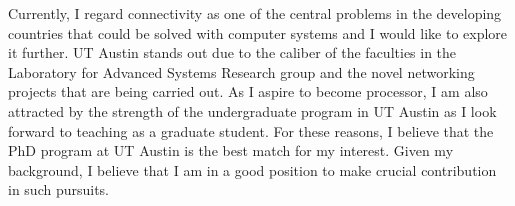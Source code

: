 \documentclass[12pt]{article}
\begin{document}
%
%

Currently, I regard connectivity as one of the central problems in the developing countries that could be solved with computer systems and I would like to explore it further. UT Austin stands out due to the caliber of the faculties in the Laboratory for Advanced Systems Research group and the novel networking projects that are being carried out. As I aspire to become processor, I am also attracted by the strength of the undergraduate program in UT Austin as I look forward to teaching as a graduate student. For these reasons, I believe that the PhD program at UT Austin is the best match for my interest. Given my background, I believe that I am in a good position to make crucial contribution in such pursuits. \newline



\end{document}
